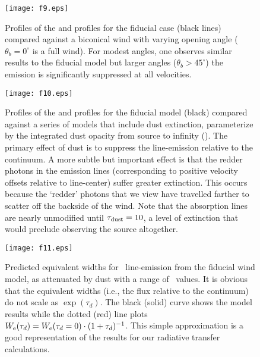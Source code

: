 \documentclass[12pt,preprint]{aastex}
\begin{document}
\begin{figure}
\texttt{[image: f9.eps]}
\caption{
Profiles of the  and  profiles for the fiducial
case (black lines) compared against a biconical wind with varying
opening angle ($\theta_b = 0^\circ$ is a full wind).  For modest angles, one
observes similar results to the fiducial model but larger angles
($\theta_b > 45^\circ$) the emission is significantly suppressed at
all velocities.  
}
\label{fig:biconical}
\end{figure}

\begin{figure}
\texttt{[image: f10.eps]}
\caption{
Profiles of the  and  profiles for the fiducial
model (black) compared against a series of models that include 
dust extinction, parameterize by the integrated dust opacity from
source to infinity (\taud).  The primary effect of dust is to suppress 
the line-emission relative to the continuum. 
A more subtle but important effect is that the redder photons in the
emission lines (corresponding to positive velocity offsets relative to
line-center) suffer greater extinction.  
This occurs because the `redder' photons that we view have travelled 
farther to scatter off the backside of the wind.  Note that
the absorption lines are nearly unmodified until $\tau_{\rm dust} = 10$, a
level of extinction that would preclude observing the source
altogether.
}
\label{fig:dust}
\end{figure}

\begin{figure}
\texttt{[image: f11.eps]}
\caption{
Predicted equivalent widths for \mgiib\ line-emission from the
fiducial wind model, as attenuated by dust with a range of \taud\
values.  
It is obvious that the equivalent widths (i.e., the flux relative to
the continuum) do not scale as $\exp(\tau_d)$.
The black (solid) curve shows the model results while the
dotted (red) line plots $W_{\rm e}(\tau_d) = W_{\rm e}(\tau_d = 0)
\cdot (1+\tau_d)^{-1}$.  This simple approximation is a good
representation of the results for our radiative transfer calculations.   
}
\label{fig:dust_tau}
\end{figure}
\end{document}
